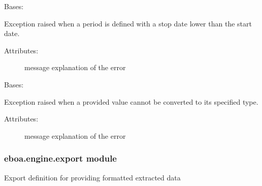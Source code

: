 
\begin{fulllineitems}
\label{\detokenize{eboa.engine:eboa.engine.errors.WrongPeriod}}
Bases: {\hyperref[\detokenize{eboa.engine:eboa.engine.errors.Error}]{}}

Exception raised when a period is defined with a stop date lower than the start date.
\begin{description}
\item[{Attributes:}] \leavevmode
message \textendash{} explanation of the error

\end{description}

\end{fulllineitems}


\begin{fulllineitems}
\label{\detokenize{eboa.engine:eboa.engine.errors.WrongValue}}
Bases: {\hyperref[\detokenize{eboa.engine:eboa.engine.errors.Error}]{}}

Exception raised when a provided value cannot be converted to its specified type.
\begin{description}
\item[{Attributes:}] \leavevmode
message \textendash{} explanation of the error

\end{description}

\end{fulllineitems}



\subsubsection{eboa.engine.export module}
\label{\detokenize{eboa.engine:module-eboa.engine.export}}\label{\detokenize{eboa.engine:eboa-engine-export-module}}
Export definition for providing formatted extracted data

